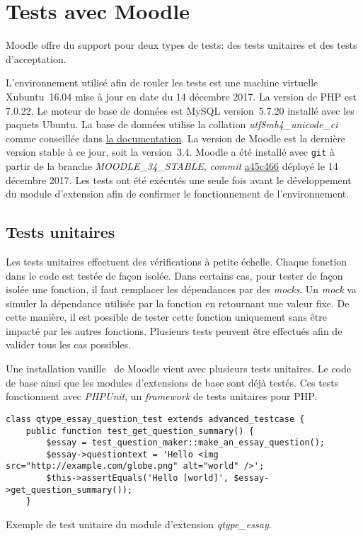 \chapter{Tests avec Moodle}

Moodle offre du support pour deux types de tests: des tests unitaires et des tests d'acceptation.

L'environnement utilisé afin de rouler les tests est une machine virtuelle Xubuntu~16.04 mise à jour en date du 14 décembre 2017.
La version de PHP est 7.0.22.
Le moteur de base de données est MySQL version~5.7.20 installé avec les paquets Ubuntu.
La base de données utilise la collation \textit{utf8mb4\_unicode\_ci} comme conseillée dans \href{https://docs.moodle.org/34/en/MySQL}{la documentation}.
La version de Moodle est la dernière version stable à ce jour, soit la version~3.4.
Moodle a été installé avec \texttt{git} à partir de la branche \textit{MOODLE\_34\_STABLE}, \textit{commit} \href{https://github.com/moodle/moodle/commit/a45c46600021667691dbb4bce5420a2f65d3239c}{a45c466} déployé le 14 décembre 2017.
Les tests ont été exécutés une seule fois avant le développement du module d'extension afin de confirmer le fonctionnement de l'environnement.

\section{Tests unitaires}

Les tests unitaires effectuent des vérifications à petite échelle.
Chaque fonction dans le code est testée de fa\c{c}on isol\'ee.
Dans certains cas, pour tester de fa\c{c}on isol\'ee une fonction, il faut remplacer les dépendances par des \textit{mocks}.
Un \textit{mock} va simuler la dépendance utilisée par la fonction en retournant une valeur fixe.
De cette manière, il est possible de tester cette fonction uniquement sans être impacté par les autres fonctions.
Plusieurs tests peuvent être effectués afin de valider tous les cas possibles.

Une installation \og vanille \fg\ de Moodle vient avec plusieurs tests unitaires.
Le code de base ainsi que les modules d'extensions de base sont déjà testés.
Ces tests fonctionnent avec \textit{PHPUnit}, un \textit{framework} de tests unitaires pour PHP.

\begin{lstfloat}
\begin{lstlisting}[frame=l]
class qtype_essay_question_test extends advanced_testcase {
    public function test_get_question_summary() {
        $essay = test_question_maker::make_an_essay_question();
        $essay->questiontext = 'Hello <img src="http://example.com/globe.png" alt="world" />';
        $this->assertEquals('Hello [world]', $essay->get_question_summary());
    }
\end{lstlisting}
\caption{Exemple de test unitaire du module d'extension \textit{qtype\_essay}.}
\label{code:unittest}
\end{lstfloat}

